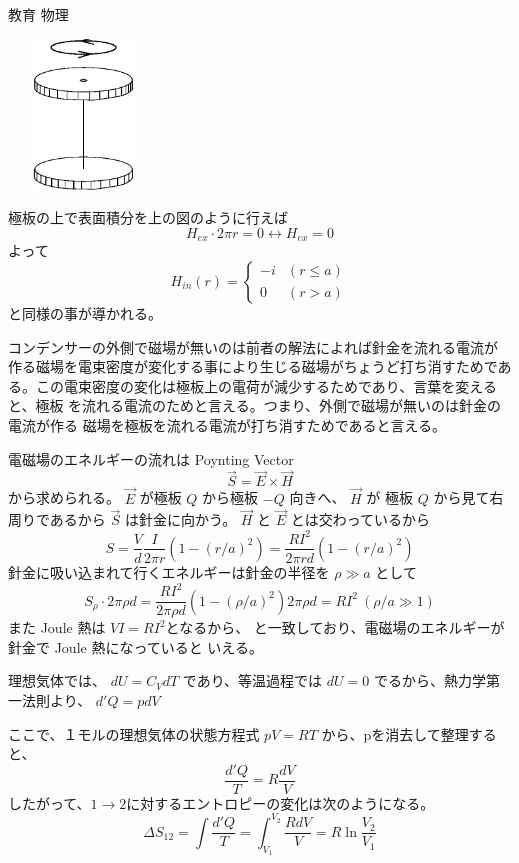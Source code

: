 \documentclass[fleqn]{jbook}
\begin{document}
\begin{answer}{教育 物理}{}
\begin{subanswers}
\begin{subsubanswers}
\parbox[t]{50mm}{\begin{center}
\includegraphics[clip,height=40mm,width=40mm]{1992phys-6.eps}
\end{center}}\parbox[t]{110mm}{
極板の上で表面積分を上の図のように行えば
\[ H_{ex} \cdot 2 \pi r = 0 \leftrightarrow H_{ex} = 0 \]
よって
\[ H_{in} (r) = \begin{cases}
                -i  & (r\le a ) \\
                0   & (r > a )
        \end{cases}\]
と同様の事が導かれる。

コンデンサーの外側で磁場が無いのは前者の解法によれば針金を流れる電流が
作る磁場を電束密度が変化する事により生じる磁場がちょうど打ち消すためである。この電束密度の変化は極板上の電荷が減少するためであり、言葉を変えると、極板
を流れる電流のためと言える。つまり、外側で磁場が無いのは針金の電流が作る
磁場を極板を流れる電流が打ち消すためであると言える。}

\SubSubAnswer
電磁場のエネルギーの流れは Poynting Vector
\[ \vec{S} = \vec{E} \times \vec{H} \]
から求められる。 $\vec{E}$ が極板 $Q$ から極板 $-Q$ 向きへ、 $\vec{H}$ が
極板 $Q$ から見て右周りであるから $\vec{S}$ は針金に向かう。 $\vec{H}$ と
 $\vec{E}$ とは交わっているから
\[
S = \frac{V}{d}\frac{I}{2\pi r} \left( 1 - \left(r/a\right)^2 \right) 
 =  \frac{RI^2}{2\pi rd} \left( 1 - (r/a)^2 \right) 
\]
針金に吸い込まれて行くエネルギーは針金の半径を $\rho \gg a$ として
\[
S_{\rho} \cdot 2\pi \rho d = \frac{RI^2}{2\pi \rho d} \left( 1 - \left(\rho / a
\right)^2 \right) 2 \pi \rho d 
= RI^{2} \ \left(\rho / a \gg 1\right) 
\]
また Joule 熱は  $VI = RI^{2} $となるから、
と一致しており、電磁場のエネルギーが針金で Joule 熱になっていると
いえる。

\end{subsubanswers}

\SubAnswer
\begin{subsubanswers}
理想気体では、
$\displaystyle{dU = C_{V} dT}$
であり、等温過程では
$\displaystyle{
dU = 0
}$
でるから、熱力学第一法則より、
$\displaystyle{
d'Q = p dV
}$

ここで、１モルの理想気体の状態方程式
$\displaystyle{
pV =RT
}$
から、pを消去して整理すると、
\[
\frac{d'Q}{T} = R\frac{dV}{V}
\]
したがって、$1 \rightarrow 2$に対するエントロピーの変化は次のようになる。
\[
\Delta S_{12} =  \int \frac{d'Q}{T}
              = \int_{V_{1}}^{V_{2}}\frac{RdV}{V}
             =   R\ln \frac{V_{2}}{V_{1}}
\]


\end{subsubanswers}
\end{subanswers}
\end{answer}
\end{document}
